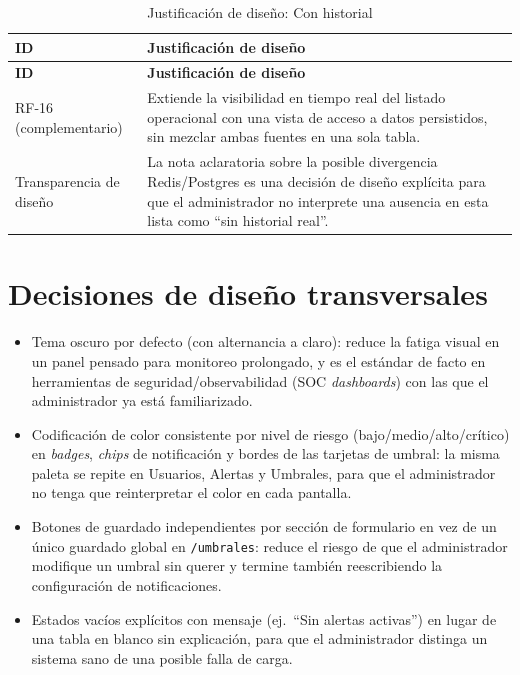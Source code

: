 \begin{longtable}{p{1.8cm}p{12.8cm}}
	\caption{Justificación de diseño: Con historial}
	\label{tab:mockup-historial}\\
	\hline
	\textbf{ID} & \textbf{Justificación de diseño} \\
	\hline
	\endfirsthead
	\hline
	\textbf{ID} & \textbf{Justificación de diseño} \\
	\hline
	\endhead
	RF-16 (complementario) & Extiende la visibilidad en tiempo real del listado operacional con una vista de acceso a datos persistidos, sin mezclar ambas fuentes en una sola tabla. \\
	\hline
	Transparencia de diseño & La nota aclaratoria sobre la posible divergencia Redis/Postgres es una decisión de diseño explícita para que el administrador no interprete una ausencia en esta lista como ``sin historial real''. \\
	\hline
\end{longtable}
\FloatBarrier

\section{Decisiones de diseño transversales}
\label{sec:decisiones-transversales-mockups}
\begin{itemize}
	\item Tema oscuro por defecto (con alternancia a claro): reduce la fatiga visual en un panel pensado para monitoreo prolongado, y es el estándar de facto en herramientas de seguridad/observabilidad (SOC \emph{dashboards}) con las que el administrador ya está familiarizado.
	\item Codificación de color consistente por nivel de riesgo (bajo/medio/alto/crítico) en \emph{badges}, \emph{chips} de notificación y bordes de las tarjetas de umbral: la misma paleta se repite en Usuarios, Alertas y Umbrales, para que el administrador no tenga que reinterpretar el color en cada pantalla.
	\item Botones de guardado independientes por sección de formulario en vez de un único guardado global en \texttt{/umbrales}: reduce el riesgo de que el administrador modifique un umbral sin querer y termine también reescribiendo la configuración de notificaciones.
	\item Estados vacíos explícitos con mensaje (ej.\ ``Sin alertas activas'') en lugar de una tabla en blanco sin explicación, para que el administrador distinga un sistema sano de una posible falla de carga.
\end{itemize}

